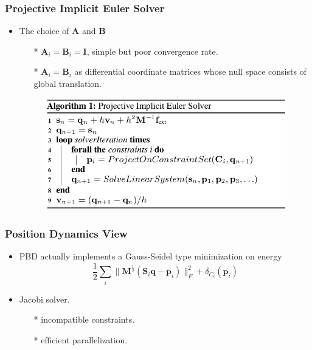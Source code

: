 \documentclass[serif,mathserif]{beamer}
\begin{document}
\begin{frame}
 \frametitle{Projective Implicit Euler Solver}
 \begin{itemize}
  \item The choice of $\mathbf{A}$ and $\mathbf{B}$
    \begin{itemize}
     \item[*] $\mathbf{A}_i=\mathbf{B}_i=\mathbf{I}$, simple but poor convergence rate.
     \item[*] $\mathbf{A}_i=\mathbf{B}_i$ as differential coordinate matrices whose null space consists of global translation.
    \end{itemize}
  \begin{figure}[h]
    \centering
    \includegraphics[scale=0.4]{pic/algorithm.png}
  \end{figure}
 \end{itemize}
\end{frame}

\begin{frame}
 \frametitle{Position Dynamics View}
 \begin{itemize}
  \item PBD actually implements a Gauss-Seidel type minimization on energy
    \begin{equation*}
     \frac{1}{2} \sum_i \|\mathbf{M}^{\frac{1}{2}}(\mathbf{S}_i\mathbf{q}-\mathbf{p}_i)\|^2_F+ \delta_{C_i}(\mathbf{p}_i)
    \end{equation*}
  \item Jacobi solver.
    \begin{itemize}
     \item[*] incompatible constraints.
     \item[*] efficient parallelization.
    \end{itemize}
 \end{itemize}
\end{frame}
\end{document}
